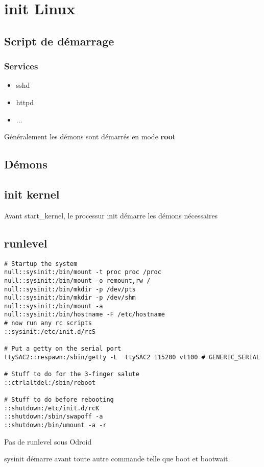 \chapter{init Linux}
\section{Script de démarrage}
\subsection{Services}
\begin{itemize}
	\item sshd
	\item httpd
	\item ...
\end{itemize}
Généralement les démons sont démarrés en mode \textbf{root}

\section{Démons}

\section{init kernel}
Avant start\_kernel, le processur init démarre les démons nécessaires

\section{runlevel}
\begin{lstlisting}[style=Bash]
# Startup the system
null::sysinit:/bin/mount -t proc proc /proc
null::sysinit:/bin/mount -o remount,rw /
null::sysinit:/bin/mkdir -p /dev/pts
null::sysinit:/bin/mkdir -p /dev/shm
null::sysinit:/bin/mount -a
null::sysinit:/bin/hostname -F /etc/hostname
# now run any rc scripts
::sysinit:/etc/init.d/rcS

# Put a getty on the serial port
ttySAC2::respawn:/sbin/getty -L  ttySAC2 115200 vt100 # GENERIC_SERIAL

# Stuff to do for the 3-finger salute
::ctrlaltdel:/sbin/reboot

# Stuff to do before rebooting
::shutdown:/etc/init.d/rcK
::shutdown:/sbin/swapoff -a
::shutdown:/bin/umount -a -r
\end{lstlisting}
Pas de runlevel sous Odroid

sysinit démarre avant toute autre commande telle que boot et bootwait.
